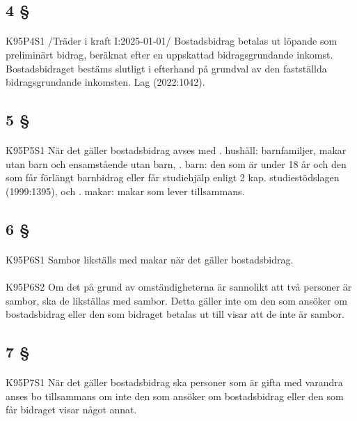 \documentclass[a4paper,notitlepage,openany,10pt]{book}
\begin{document}
\subsection*{4 §}
\paragraph*{}
{\tiny K95P4S1}
/Träder i kraft I:2025-01-01/
Bostadsbidrag betalas ut löpande som preliminärt bidrag, beräknat efter en uppskattad bidragsgrundande inkomst. Bostadsbidraget bestäms slutligt i efterhand på grundval av den fastställda bidragsgrundande inkomsten.
Lag (2022:1042).
\subsection*{5 §}
\paragraph*{}
{\tiny K95P5S1}
När det gäller bostadsbidrag avses med
. hushåll: barnfamiljer, makar utan barn och ensamstående utan barn,
. barn: den som är under 18 år och den som får förlängt barnbidrag eller får studiehjälp enligt 2 kap.
studiestödslagen (1999:1395), och
. makar: makar som lever tillsammans.
\subsection*{6 §}
\paragraph*{}
{\tiny K95P6S1}
Sambor likställs med makar när det gäller bostadsbidrag.
\paragraph*{}
{\tiny K95P6S2}
Om det på grund av omständigheterna är sannolikt att två personer är sambor, ska de likställas med sambor. Detta gäller inte om den som ansöker om bostadsbidrag eller den som bidraget betalas ut till visar att de inte är sambor.
\subsection*{7 §}
\paragraph*{}
{\tiny K95P7S1}
När det gäller bostadsbidrag ska personer som är gifta med varandra anses bo tillsammans om inte den som ansöker om bostadsbidrag eller den som får bidraget visar något annat.
\end{document}

